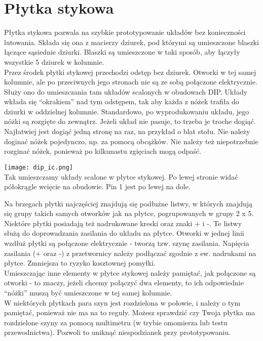 \documentclass{pdfBooklets}
\begin{document}
\section{Płytka stykowa}
Płytka stykowa pozwala na szybkie prototypowanie układów bez konieczności lutowania. Składa się ona z macierzy dziurek,
pod którymi są umieszczone blaszki łączące sąsiednie dziurki. Blaszki są umieszczone w taki sposób, aby łączyły wszystkie
5 dziurek w kolumnie.
\\

Przez środek płytki stykowej przechodzi odstęp bez dziurek. Otworki w tej samej kolumnie, ale po przeciwnych jego
stronach nie są ze sobą połączone elektrycznie. Służy ono do umieszczania tam układów scalonych w obudowach DIP.
Układy wkłada się ``okrakiem'' nad tym odstępem, tak aby każda z nóżek trafiła do dziurki w oddzielnej kolumnie.
Standardowo, po wyprodukowaniu układu, jego nóżki są rozgięte do zewnątrz. Jeżeli układ nie pasuje, to trzeba je troche dogiąć.
Najłatwiej jest dogiąć jedną stronę na raz, na przykład o blat stołu. Nie należy doginać nóżek pojedynczo, np. za pomocą obcążków.
Nie należy też niepotrzebnie rozginać nóżek, ponieważ po kilkunastu zgięciach mogą odpaść.
\\

\begin{center}
  \noindent\texttt{[image: dip\_ic.png]}\\
  Tak umieszczamy układy scalone w płytce stykowej. Po lewej stronie widać półokrągle wcięcie na obudowie. Pin 1 jest po lewej na dole.
\end{center}

Na brzegach płytki najczęściej znajdują się podłużne listwy, w których znajdują się grupy takich samych otworków jak
na płytce, pogrupowanych w grupy 2 x 5. Niektóre płytki posiadają też nadrukowane kreski oraz znaki + i -. Te listwy
służą do doprowadzania zasilania do układu na płytce. Otworki w jednej linii wzdłuż płytki są połączone elektrycznie - tworzą tzw.
szynę zasilania. Napięcia zasilania (+ oraz -) z przetwornicy należy podłączać zgodnie z ew. nadrukami na płytce. Zmniejsza to ryzyko
kosztownej pomyłki.
\\

Umieszczając inne elementy w płytce stykowej należy pamiętać, jak połączone są otworki - to znaczy, jeżeli chcemy
połączyć dwa elementy, to ich odpowiednie ``nóżki'' muszą być umieszczone w tej samej kolumnie.
\\

W niektórych płytkach para szyn jest rozdzielona w połowie, i należy o tym pamiętać, ponieważ nie ma na to reguły.
Możesz sprawdzić czy Twoja płytka ma rozdzielone szyny za pomocą multimetru (w trybie omomierza lub testu przewodnictwa). Pozwoli to uniknąć
niespodzianek przy prototypowaniu.
\end{document}
